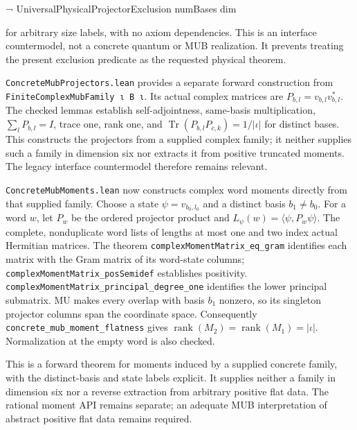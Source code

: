 \documentclass[
]{article}
\newenvironment{Shaded}{}{}
\newcommand{\NormalTok}[1]{#1}
\begin{document}
\begin{Shaded}
\begin{Highlighting}[]
\NormalTok{¬ UniversalPhysicalProjectorExclusion numBases dim}
\end{Highlighting}
\end{Shaded}

for arbitrary size labels, with no axiom dependencies. This is an
interface countermodel, not a concrete quantum or MUB realization. It
prevents treating the present exclusion predicate as the requested
physical theorem.

\nolinkurl{ConcreteMubProjectors.lean} provides a separate forward
construction from \nolinkurl{FiniteComplexMubFamily ι B ι}. Its actual
complex matrices are \(P_{b,l}=v_{b,l}v_{b,l}^*\). The checked lemmas
establish self-adjointness, same-basis multiplication,
\(\sum_l P_{b,l}=I\), trace one, rank one, and
\(\operatorname{Tr}(P_{b,l}P_{c,k})=1/|\iota|\) for distinct bases. This
constructs the projectors from a supplied complex family; it neither
supplies such a family in dimension six nor extracts it from positive
truncated moments. The legacy interface countermodel therefore remains
relevant.

\nolinkurl{ConcreteMubMoments.lean} now constructs complex word moments
directly from that supplied family. Choose a state \(\psi=v_{b_0,l_0}\)
and a distinct basis \(b_1\ne b_0\). For a word \(w\), let \(P_w\) be
the ordered projector product and
\(L_\psi(w)=\langle\psi,P_w\psi\rangle\). The complete, nonduplicate
word lists of lengths at most one and two index actual Hermitian
matrices. The theorem \nolinkurl{complexMomentMatrix_eq_gram} identifies
each matrix with the Gram matrix of its word-state columns;
\nolinkurl{complexMomentMatrix_posSemidef} establishes positivity.
\nolinkurl{complexMomentMatrix_principal_degree_one} identifies the
lower principal submatrix. MU makes every overlap with basis \(b_1\)
nonzero, so its singleton projector columns span the coordinate space.
Consequently \nolinkurl{concrete_mub_moment_flatness} gives
\(\operatorname{rank}(M_2)=\operatorname{rank}(M_1)=|\iota|\).
Normalization at the empty word is also checked.

This is a forward theorem for moments induced by a supplied concrete
family, with the distinct-basis and state labels explicit. It supplies
neither a family in dimension six nor a reverse extraction from
arbitrary positive flat data. The rational moment API remains separate;
an adequate MUB interpretation of abstract positive flat data remains
required.
\end{document}
